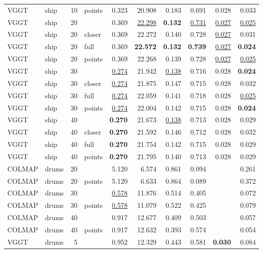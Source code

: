 \begin{table}[H]
\begin{tabular}{llrlrrrrrr}
VGGT & ship & 10 & points & 0.323 & 20.908 & 0.183 & 0.691 & 0.028 & 0.033 \\
VGGT & ship & 20 &  & 0.369 & \underline{22.298} & \textbf{0.132} & \underline{0.731} & \underline{0.027} & \underline{0.025} \\
VGGT & ship & 20 & closer & 0.369 & 22.272 & 0.140 & 0.728 & \underline{0.027} & 0.031 \\
VGGT & ship & 20 & full & 0.369 & \textbf{22.572} & \textbf{0.132} & \textbf{0.739} & \underline{0.027} & \textbf{0.024} \\
VGGT & ship & 20 & points & 0.369 & 22.268 & 0.139 & 0.728 & \underline{0.027} & \underline{0.025} \\
VGGT & ship & 30 &  & \underline{0.274} & 21.942 & \underline{0.138} & 0.716 & 0.028 & \textbf{0.024} \\
VGGT & ship & 30 & closer & \underline{0.274} & 21.875 & 0.147 & 0.715 & 0.028 & 0.032 \\
VGGT & ship & 30 & full & \underline{0.274} & 22.059 & 0.141 & 0.718 & 0.028 & \underline{0.025} \\
VGGT & ship & 30 & points & \underline{0.274} & 22.004 & 0.142 & 0.715 & 0.028 & \textbf{0.024} \\
VGGT & ship & 40 &  & \textbf{0.270} & 21.673 & \underline{0.138} & 0.713 & 0.028 & 0.029 \\
VGGT & ship & 40 & closer & \textbf{0.270} & 21.592 & 0.146 & 0.712 & 0.028 & 0.032 \\
VGGT & ship & 40 & full & \textbf{0.270} & 21.754 & 0.142 & 0.715 & 0.028 & 0.029 \\
VGGT & ship & 40 & points & \textbf{0.270} & 21.795 & 0.140 & 0.713 & 0.028 & 0.029 \\
\midrule
COLMAP & drums & 20 &  & 5.120 & 6.574 & 0.861 & 0.094 &  & 0.261 \\
COLMAP & drums & 20 & points & 5.120 & 6.633 & 0.864 & 0.089 &  & 0.372 \\
COLMAP & drums & 30 &  & \underline{0.578} & 11.876 & 0.514 & 0.405 &  & 0.072 \\
COLMAP & drums & 30 & points & \underline{0.578} & 11.079 & 0.522 & 0.425 &  & 0.079 \\
COLMAP & drums & 40 &  & 0.917 & 12.677 & 0.409 & 0.503 &  & 0.057 \\
COLMAP & drums & 40 & points & 0.917 & 12.632 & 0.393 & 0.574 &  & 0.054 \\
VGGT & drums & 5 &  & 0.952 & 12.329 & 0.443 & 0.581 & \textbf{0.030} & 0.084 \\

\end{tabular}
\end{table}

